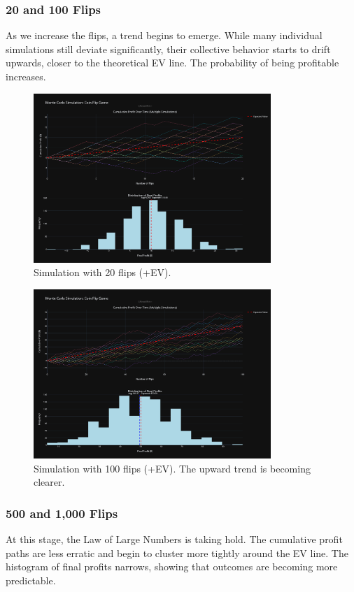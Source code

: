 \documentclass[12pt]{article}
\begin{document}
\subsubsection{20 and 100 Flips}
As we increase the flips, a trend begins to emerge. While many individual simulations still deviate significantly, their collective behavior starts to drift upwards, closer to the theoretical EV line. The probability of being profitable increases.

\begin{figure}[h!]
\centering
\includegraphics[width=0.8\textwidth]{+ev/20+ev.png}
\caption{Simulation with 20 flips (+EV).}
\end{figure}

\begin{figure}[h!]
\centering
\includegraphics[width=0.8\textwidth]{+ev/100+ev.png}
\caption{Simulation with 100 flips (+EV). The upward trend is becoming clearer.}
\end{figure}
\clearpage

\subsubsection{500 and 1,000 Flips}
At this stage, the Law of Large Numbers is taking hold. The cumulative profit paths are less erratic and begin to cluster more tightly around the EV line. The histogram of final profits narrows, showing that outcomes are becoming more predictable.
\end{document}
